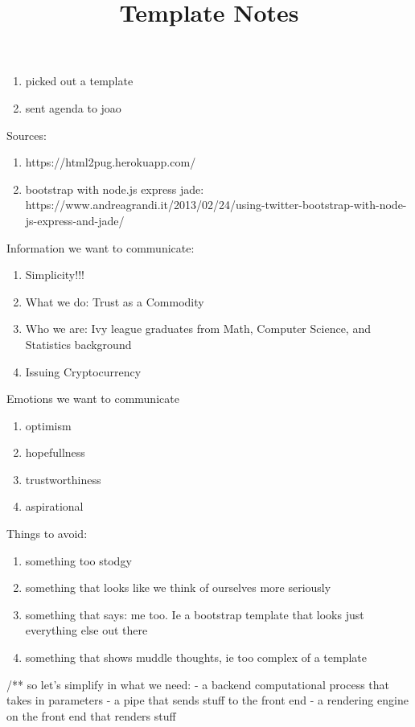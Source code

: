 \begin{enumerate}
	\item picked out a template
	\item sent agenda to joao
\end{enumerate}

Sources:

\begin{enumerate}
	\item https://html2pug.herokuapp.com/
	\item bootstrap with node.js express jade: https://www.andreagrandi.it/2013/02/24/using-twitter-bootstrap-with-node-js-express-and-jade/
\end{enumerate}

\title{Template Notes}

Information we want to communicate: 

\begin{enumerate}
	\item Simplicity!!!
	\item What we do: Trust as a Commodity
	\item Who we are: Ivy league graduates from Math, Computer Science, and Statistics background
	\item Issuing Cryptocurrency
\end{enumerate}

Emotions we want to communicate

\begin{enumerate}
	\item optimism
	\item hopefullness
	\item trustworthiness
	\item aspirational
\end{enumerate}

Things to avoid:

\begin{enumerate}
	\item something too stodgy
	\item something that looks like we think of ourselves more seriously
	\item something that says: me too. Ie a bootstrap template that looks just everything else out there
	\item something that shows muddle thoughts, ie too complex of a template
\end{enumerate}

/**
	so let's simplify in what we need:
		- a backend computational process that takes in parameters
		- a pipe that sends stuff to the front end
		- a rendering engine on the front end that renders stuff	

